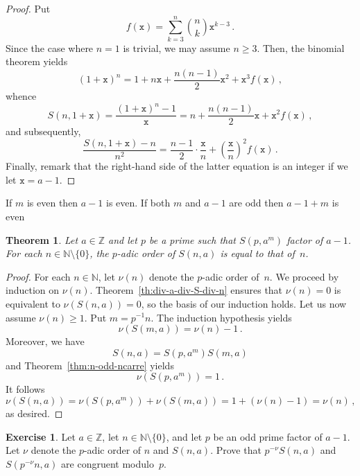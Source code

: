 \documentclass[12pt]{article}
\newcommand{\bZ}{\mathbb{Z}}
\newcommand{\ttx}{\mathtt{x}}
\newcommand{\bN}{\mathbb{N}} %
\newcommand{\bNast}{\bN \setminus \{ 0 \}}
\newtheorem{theorem}{Theorem}
\theoremstyle{definition}
\newtheorem{exercise}{Exercise}
\begin{document}
   \begin{proof}
   Put 
    $$
    f(\ttx) = \sum_{k = 3}^n \binom{n}{k} \ttx^{k - 3} \, .
    $$
   Since the case where $n = 1$ is trivial, we may assume $n \ge 3$.
   Then, the binomial theorem yields
   $$
   {(1 + \ttx)}^n =  1 + n \ttx + \frac{n(n - 1)}{2} \ttx^2 +  \ttx^3 f(\ttx) \,, 
   $$
   whence
   $$
   S(n, 1 + \ttx) = \frac{{(1 + \ttx)}^n - 1}{\ttx} = n + \frac{n(n - 1)}{2} \ttx + \ttx^2 f(\ttx) \,, 
   $$
   and subsequently, 
   $$
   \frac{S(n, 1 + \ttx) - n}{n^2} = \frac{n - 1}{2} \cdot  \frac{\ttx}{n}  + \left( \frac{\ttx}{n} \right)^2 f(\ttx) \, . 
   $$
   Finally, remark that the right-hand side of the latter equation is an integer if we let $\ttx = a - 1$.  
 \end{proof}

 If $m$ is even then $a - 1$ is even.
 If both $m$ and $a - 1$ are odd then $a - 1 + m$ is even 







 \begin{theorem}
   Let $a \in \bZ$ and let $p$ be a prime such that $S(p, a^m)$ factor of $a - 1$.
   For each $n \in \bNast$, the $p$-adic order of $S(n, a)$ is equal to that of~$n$.
 \end{theorem}

 \begin{proof}
   For each $n \in \bN$, let $\nu(n)$ denote the $p$-adic order of~$n$.
   We proceed by induction on $\nu(n)$.
   Theorem~\ref{th:div-a-div-S-div-n} ensures that $\nu(n) = 0$ is equivalent to  $\nu(S(n, a)) = 0$,
   so the basis of our induction holds.
   Let us now assume $\nu(n) \ge 1$.
   Put $m =  p^{-1} n$.
   The induction hypothesis yields
   $$
   \nu(S(m, a)) = \nu(n) - 1 \, .
   $$
   Moreover, we have 
   $$
   S(n, a) = S(p, a^m) S(m, a) 
   $$
   and Theorem~\ref{thm:n-odd-ncarre} yields 
   $$\nu(S(p, a^m)) = 1 \, .$$
   It follows
   $$
   \nu(S(n, a))
   = \nu(S(p, a^m)) + \nu(S(m, a))
   = 1 + (\nu(n) - 1)
   = \nu(n) \,, 
   $$
   as desired.  
 \end{proof}

 \begin{exercise}
   Let $a \in \bZ$, let $n \in \bNast$, and let $p$ be an odd prime factor of $a - 1$.
   Let $\nu$ denote the $p$-adic order of $n$ and $S(n, a)$.
   Prove that $p^{-\nu} S(n, a)$ and $S(p^{- \nu} n, a)$ are congruent modulo~$p$.   
 \end{exercise}
 
\end{document}
